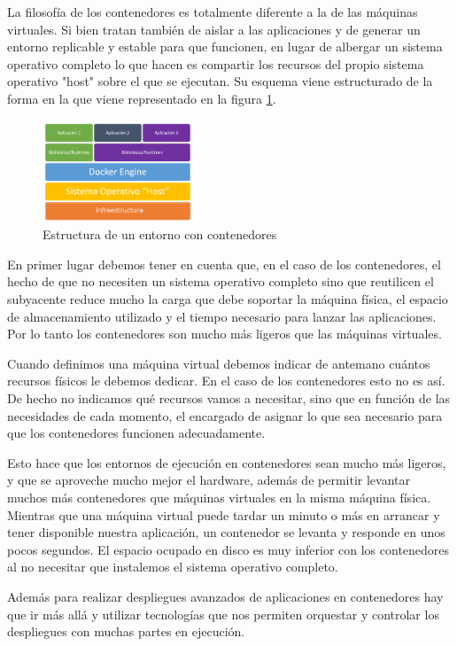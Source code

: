 La filosofía de los contenedores es totalmente diferente a la de las máquinas virtuales. Si bien tratan también de aislar a las aplicaciones y de generar un entorno replicable y estable para que funcionen, en lugar de albergar un sistema operativo completo lo que hacen es compartir los recursos del propio sistema operativo "host" sobre el que se ejecutan.
\newpage
Su esquema viene estructurado de la forma en la que viene representado en la figura \ref{contenedores}.

\begin{figure}[H]
	\centering
	\includegraphics[width=0.4\textwidth]{imagenes/entorno/contenedores.png}
	\caption{Estructura de un entorno con contenedores} \label{contenedores}
\end{figure}
En primer lugar debemos tener en cuenta que, en el caso de los contenedores, el hecho de que no necesiten un sistema operativo completo sino que reutilicen el subyacente reduce mucho la carga que debe soportar la máquina física, el espacio de almacenamiento utilizado y el tiempo necesario para lanzar las aplicaciones. Por lo tanto los contenedores son mucho más ligeros que las máquinas virtuales.

Cuando definimos una máquina virtual debemos indicar de antemano cuántos recursos físicos le debemos dedicar. En el caso de los contenedores esto no es así. De hecho no indicamos qué recursos vamos a necesitar, sino que en función de las necesidades de cada momento, el encargado de asignar lo que sea necesario para que los contenedores funcionen adecuadamente.

Esto hace que los entornos de ejecución en contenedores sean mucho más ligeros, y que se aproveche mucho mejor el hardware, además de permitir levantar muchos más contenedores que máquinas virtuales en la misma máquina física. Mientras que una máquina virtual puede tardar un minuto o más en arrancar y tener disponible nuestra aplicación, un contenedor se levanta y responde en unos pocos segundos. El espacio ocupado en disco es muy inferior con los contenedores al no necesitar que instalemos el sistema operativo completo.

Además para realizar despliegues avanzados de aplicaciones en contenedores hay que ir más allá y utilizar tecnologías que nos permiten orquestar y controlar los despliegues con muchas partes en ejecución.

